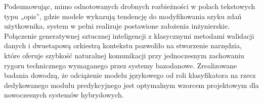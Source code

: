Podsumowując, mimo odnotowanych drobnych rozbieżności w polach tekstowych typu „opis”, gdzie modele wykazują tendencję do modyfikowania szyku zdań użytkownika, system w pełni realizuje postawione założenia inżynierskie. Połączenie generatywnej sztucznej inteligencji z klasycznymi metodami walidacji danych i dwuetapową orkiestrą kontekstu pozwoliło na stworzenie narzędzia, które oferuje szybkość naturalnej komunikacji przy jednoczesnym zachowaniu rygoru technicznego wymaganego przez systemy bazodanowe. Zrealizowane badania dowodzą, że odciążenie modelu językowego od roli klasyfikatora na rzecz dedykowanego modułu predykcyjnego jest optymalnym wzorcem projektowym dla nowoczesnych systemów hybrydowych.
